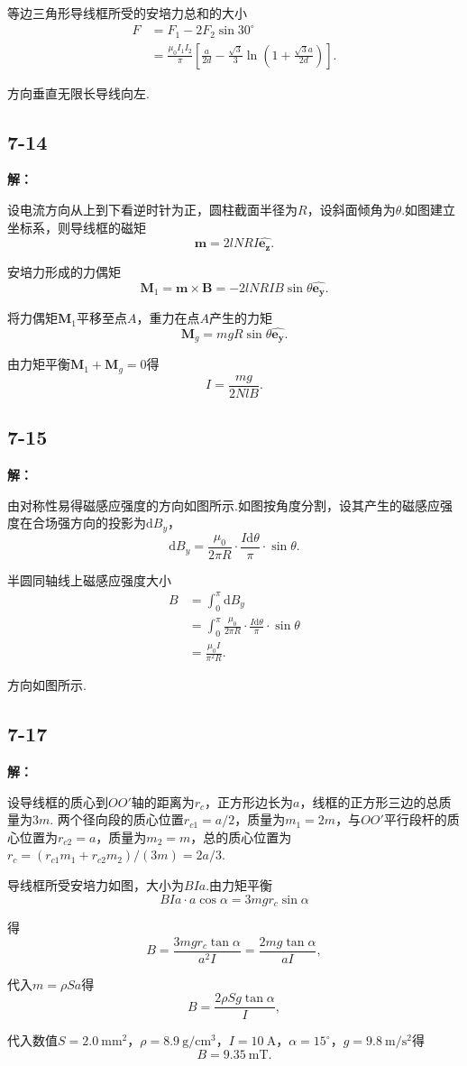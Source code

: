 \documentclass[twocolumn]{ctexart}
\newcommand{\sol}[1]{\subsection*{#1}\noindent\textbf{解：}
	
}
\begin{document}
	等边三角形导线框所受的安培力总和的大小
	\begin{align*}
		F&=F_1-2F_2\sin30^\circ{}\\
		&=\frac{\mu_0I_1I_2}{\pi}\left[\frac{a}{2d}-\frac{\sqrt{3}}{3}\ln\left(1+\frac{\sqrt{3}a}{2d}\right)\right].
	\end{align*}
	
	方向垂直无限长导线向左.
	
	\sol{7-14}
	
	设电流方向从上到下看逆时针为正，圆柱截面半径为$R$，设斜面倾角为$\theta$.如图建立坐标系，则导线框的磁矩
	$$\mathbf m=2lNRI\hat{\mathbf{e_z}}.$$
	
	安培力形成的力偶矩
	$$\mathbf M_1=\mathbf m\times\mathbf B=-2lNRIB\sin\theta\hat{\mathbf{e_y}}.$$
	
	将力偶矩$\mathbf M_1$平移至点$A$，重力在点$A$产生的力矩
	$$\mathbf M_g=mgR\sin\theta\hat{\mathbf{e_y}}.$$
	
	由力矩平衡$\mathbf M_1+\mathbf M_g=0$得
	$$I=\frac{mg}{2NlB}.$$
	
	\sol{7-15}
	
	由对称性易得磁感应强度的方向如图所示.如图按角度分割，设其产生的磁感应强度在合场强方向的投影为$\mathrm dB_y$，
	$$\mathrm dB_y=\frac{\mu_0}{2\pi R}\cdot\frac{I\mathrm d\theta}{\pi}\cdot\sin\theta.$$
	
	半圆同轴线上磁感应强度大小
	\begin{align*}
		B&=\int_{0}^{\pi}\mathrm dB_y\\
		&=\int_{0}^{\pi}\frac{\mu_0}{2\pi R}\cdot\frac{I\mathrm d\theta}{\pi}\cdot\sin\theta\\
		&=\frac{\mu_0I}{\pi^2R}.
	\end{align*}

	方向如图所示.
	
	\sol{7-17}
	
	设导线框的质心到$OO'$轴的距离为$r_c$，正方形边长为$a$，线框的正方形三边的总质量为$3m$. 两个径向段的质心位置$r_{c1}=a/2$，质量为$m_1=2m$，与$OO'$平行段杆的质心位置为$r_{c2}=a$，质量为$m_2=m$，总的质心位置为$r_c=\left(r_{c1}m_1+r_{c2}m_2\right)/(3m)=2a/3$.
	
	导线框所受安培力如图，大小为$BIa$.由力矩平衡
	$$BIa\cdot a\cos\alpha=3mgr_c\sin\alpha$$
	
	得
	$$B=\frac{3mgr_c\tan\alpha}{a^2I}=\frac{2mg\tan\alpha}{aI},$$
	
	代入$m=\rho Sa$得
	$$B=\frac{2\rho Sg\tan\alpha}{I},$$
	
	代入数值$S=2.0\ \mathrm{mm^2}$，$\rho=8.9\ \mathrm{g/cm^3}$，$I=10\ \mathrm A$，$\alpha=15^\circ{}$，$g=9.8\ \mathrm{m/s^2}$得
	$$B=9.35\ \mathrm{mT}.$$
\end{document}
